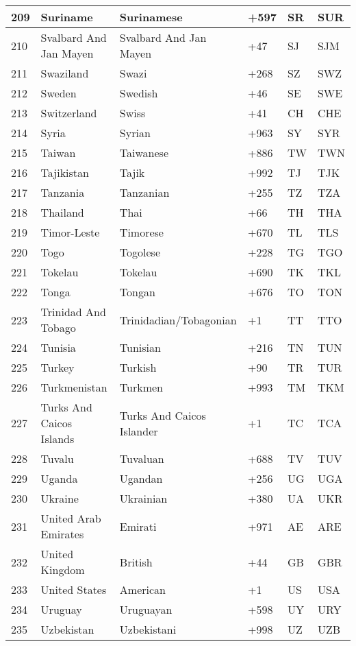\begin{longtable}{|l|l|l|l|l|l|}
209 & Suriname & Surinamese & +597 & SR & SUR \\ \hline 
210 & Svalbard And Jan Mayen & Svalbard And Jan Mayen & +47 & SJ & SJM \\ \hline 
211 & Swaziland & Swazi & +268 & SZ & SWZ \\ \hline 
212 & Sweden & Swedish & +46 & SE & SWE \\ \hline 
213 & Switzerland & Swiss & +41 & CH & CHE \\ \hline 
214 & Syria & Syrian & +963 & SY & SYR \\ \hline 
215 & Taiwan & Taiwanese & +886 & TW & TWN \\ \hline 
216 & Tajikistan & Tajik & +992 & TJ & TJK \\ \hline 
217 & Tanzania & Tanzanian & +255 & TZ & TZA \\ \hline 
218 & Thailand & Thai & +66 & TH & THA \\ \hline 
219 & Timor-Leste & Timorese & +670 & TL & TLS \\ \hline 
220 & Togo & Togolese & +228 & TG & TGO \\ \hline 
221 & Tokelau & Tokelau & +690 & TK & TKL \\ \hline 
222 & Tonga & Tongan & +676 & TO & TON \\ \hline 
223 & Trinidad And Tobago & Trinidadian/Tobagonian & +1 & TT & TTO \\ \hline 
224 & Tunisia & Tunisian & +216 & TN & TUN \\ \hline 
225 & Turkey & Turkish & +90 & TR & TUR \\ \hline 
226 & Turkmenistan & Turkmen & +993 & TM & TKM \\ \hline 
227 & Turks And Caicos Islands & Turks And Caicos Islander & +1 & TC & TCA \\ \hline 
228 & Tuvalu & Tuvaluan & +688 & TV & TUV \\ \hline 
229 & Uganda & Ugandan & +256 & UG & UGA \\ \hline 
230 & Ukraine & Ukrainian & +380 & UA & UKR \\ \hline 
231 & United Arab Emirates & Emirati & +971 & AE & ARE \\ \hline 
232 & United Kingdom & British & +44 & GB & GBR \\ \hline 
233 & United States & American & +1 & US & USA \\ \hline 
234 & Uruguay & Uruguayan & +598 & UY & URY \\ \hline 
235 & Uzbekistan & Uzbekistani & +998 & UZ & UZB \\ \hline 

\end{longtable}
